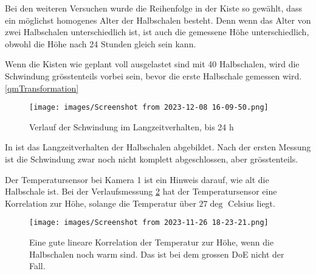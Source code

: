 
Bei den weiteren Versuchen wurde die Reihenfolge in der Kiste so gewählt, dass ein möglichst homogenes Alter der Halbschalen besteht. Denn wenn das Alter von zwei Halbschalen unterschiedlich ist, ist auch die gemessene Höhe unterschiedlich, obwohl die Höhe nach 24 Stunden gleich sein kann.

Wenn die Kisten wie geplant voll ausgelastet sind mit 40 Halbschalen, wird die Schwindung grösstenteils vorbei sein, bevor die erste Halbschale gemessen wird. \ref{qmTransformation}

\begin{figure}
   
  \texttt{[image: images/Screenshot from 2023-12-08 16-09-50.png]}
  \caption{Verlauf der Schwindung im Langzeitverhalten, bis 24 h}
  \label{fig:VerlaufSchwindExpLang}
\end{figure}

In \cite{fig:VerlaufSchwindExpLang} ist das Langzeitverhalten der Halbschalen abgebildet. Nach der ersten Messung ist die Schwindung zwar noch nicht komplett abgeschlossen, aber grösstenteils.

Der Temperatursensor bei Kamera 1 ist ein Hinweis darauf, wie alt die Halbschale ist. Bei der Verlaufsmessung \ref{fig:TempVsHohe} hat der Temperatursensor eine Korrelation zur Höhe, solange die Temperatur über $27 \deg$ Celsius liegt.

\begin{figure}
   
  \texttt{[image: images/Screenshot from 2023-11-26 18-23-21.png]}
  \caption{Eine gute lineare Korrelation der Temperatur zur Höhe, wenn die Halbschalen noch warm sind. Das ist bei dem grossen DoE nicht der Fall.}
  \label{fig:TempVsHohe}
\end{figure}

\newpage

